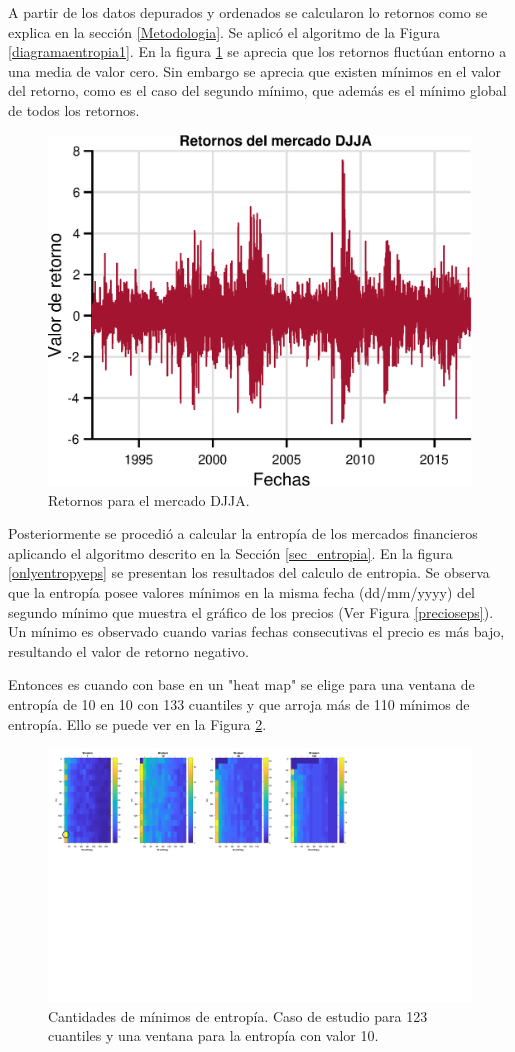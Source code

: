 A partir de los datos depurados y ordenados se calcularon lo retornos como se explica en la sección \ref{Metodologia}. Se aplicó el algoritmo de la Figura \ref{diagramaentropia1}. 
En la figura \ref{onlyreturnseps} se aprecia que los retornos fluctúan entorno a una media de valor cero. 
Sin embargo se aprecia que existen mínimos en el valor del retorno, como es el caso del segundo mínimo, que además es el mínimo global de todos los retornos.

\begin{figure}[h]
	\centering
	\includegraphics[width=0.7\linewidth]{figures/onlyreturnseps}
	\caption{Retornos para el mercado DJJA.}
	\label{onlyreturnseps}
\end{figure}

Posteriormente se procedió a calcular la entropía de los mercados financieros aplicando el algoritmo descrito en la Sección \ref{sec_entropia}.
En la figura \ref{onlyentropyeps} se presentan los resultados del calculo de entropia.
Se observa que la entropía posee valores mínimos en la misma fecha (dd/mm/yyyy) del segundo mínimo que muestra el gráfico de los precios (Ver Figura \ref{precioseps}). 
Un mínimo es observado cuando varias fechas consecutivas el precio es más bajo, resultando el valor de retorno negativo. 

Entonces es cuando con base en un "heat map" se elige para una ventana de entropía de 10 en 10 con 133 cuantiles y que arroja más de 110 mínimos de entropía. Ello se puede ver en la Figura \ref{caso1}. 


\begin{figure}[h]
	\centering
	\includegraphics[width=0.7\linewidth]{figures/simple_NQ_133_entropyW10}
	\caption{Cantidades de mínimos de entropía. Caso de estudio para 123 cuantiles y una ventana para la entropía con valor 10.}
	\label{caso1}
\end{figure}

